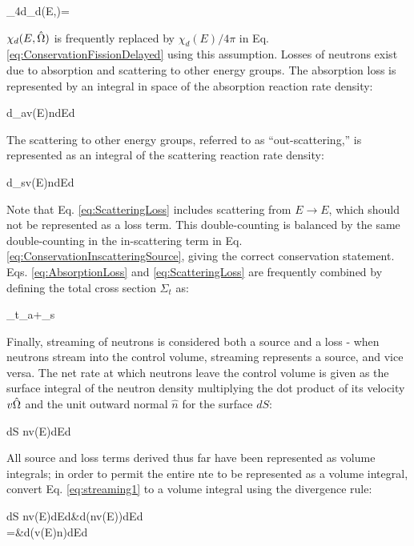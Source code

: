 \beq
\label{eq:delayed_isotropic}
\int_{4\pi}d\hO \chi_d(E,\hO)=
\eeq

\(\chi_d(E,\hat{\Omega})\) is frequently replaced by \(\chi_d(E)/4\pi\) in Eq. \eqref{eq:ConservationFissionDelayed} using this assumption. Losses of neutrons exist due to absorption and scattering to other energy groups. The absorption loss is represented by an integral in space of the absorption reaction rate density:

\beq
\label{eq:AbsorptionLoss}
\left\lbrack\int d\volume \Sigma_a\seat v(E)n\seat\right\rbrack dEd\hO
\eeq

The scattering to other energy groups, referred to as ``out-scattering,'' is represented as an integral of the scattering reaction rate density:

\beq
\label{eq:ScatteringLoss}
\left\lbrack\int d\volume \Sigma_s\seatout v(E)n\seat\right\rbrack dEd\hO
\eeq

Note that Eq. \eqref{eq:ScatteringLoss} includes scattering from \(E\rightarrow E\), which should not be represented as a loss term. This double-counting is balanced by the same double-counting in the in-scattering term in Eq. \eqref{eq:ConservationInscatteringSource}, giving the correct conservation statement. Eqs. \eqref{eq:AbsorptionLoss} and \eqref{eq:ScatteringLoss} are frequently combined by defining the total cross section \(\Sigma_t\) as:

\beq
\label{eq:TotalSigmaDef}
\Sigma_t\seatout\equiv\Sigma_a\seat+\Sigma_s\seatout
\eeq

Finally, streaming of neutrons is considered both a source and a loss - when neutrons stream into the control volume, streaming represents a source, and vice versa. The net rate at which neutrons leave the control volume is given as the surface integral of the neutron density multiplying the dot product of its velocity \(v\hat{\Omega}\) and the unit outward normal \(\hat{n}\) for the surface \(dS\):

\beq
\label{eq:streaming1}
\left\lbrack\int dS n\seat v(E)\hO\cdot{}\right\rbrack dEd\hO
\eeq

All source and loss terms derived thus far have been represented as volume integrals; in order to permit the entire \gls{nte} to be represented as a volume integral, convert Eq. \eqref{eq:streaming1} to a volume integral using the divergence rule:

\beqa
\label{eq:streaming2}
\left\lbrack\int dS n\seat v(E)\hO\cdot{}\right\rbrack dEd\hO\equiv&\left\lbrack\int d\volume\nabla\cdot\left(n\seat v(E)\hO\right)\right\rbrack dEd\hO\\
=&\left\lbrack\int d\volume\hO\cdot \nabla\left(v(E)n\seat\right)\right\rbrack dEd\hO
\eeqa

